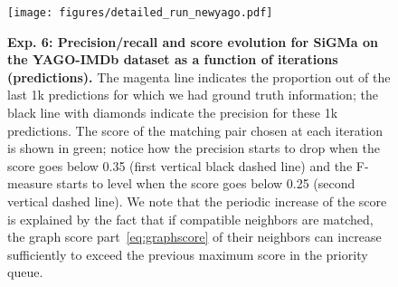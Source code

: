 \documentclass{sig-alternate}
\newcommand{\ts}[1]{\textsf{#1}}
\begin{document}
\begin{appendix}
\newpage

\begin{figure}[!t]
	\begin{center}
		\texttt{[image: figures/detailed\_run\_newyago.pdf]}
	\end{center}
	\caption{\textbf{Exp. 6: Precision/recall and score evolution for \ts{SiGMa} on the \ts{YAGO}-\ts{IMDb} dataset as a function of iterations (predictions).} \textnormal{The magenta line indicates the proportion out of the last 1k predictions for which we had ground truth information; the black line with diamonds indicate the precision for these 1k predictions. The score of the matching pair chosen at each iteration is shown in green; notice how the precision starts to drop when the score goes below 0.35 (first vertical black dashed line) and the F-measure starts to level when the score goes below 0.25 (second vertical dashed line). We note that the periodic increase of the score is explained by the fact that if compatible neighbors are matched, the graph score part~\eqref{eq:graphscore} of their neighbors can increase sufficiently to exceed the previous maximum score in the priority queue.
}} \label{fig:detailed_run}
\end{figure}

\mbox{   } %

\end{appendix}
\end{document}
